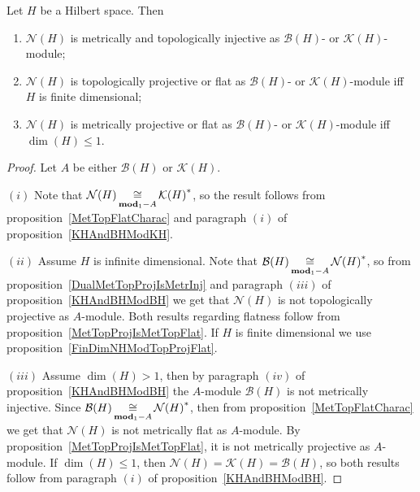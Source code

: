 \begin{proposition}\label{KHAndBHModNH} Let $H$ be a Hilbert space. Then

\begin{enumerate}[label = (\roman*)]
    \item $\mathcal{N}(H)$ is metrically and topologically injective as
    $\mathcal{B}(H)$- or $\mathcal{K}(H)$-module;

    \item $\mathcal{N}(H)$ is topologically projective or flat 
    as $\mathcal{B}(H)$- or $\mathcal{K}(H)$-module 
    iff $H$ is finite dimensional;

    \item $\mathcal{N}(H)$ is metrically projective or flat 
    as $\mathcal{B}(H)$- or $\mathcal{K}(H)$-module iff $\dim(H)\leq 1$.
\end{enumerate}
\end{proposition}
\begin{proof} Let $A$ be either $\mathcal{B}(H)$ or $\mathcal{K}(H)$.

$(i)$ Note that $\mathcal{N}(H)\mathop{\mathbin{\cong}}\limits_{\mathbf{mod}_1-A}{\mathcal{K}(H)}^*$, 
so the result follows from proposition~\ref{MetTopFlatCharac} and 
paragraph $(i)$ of proposition~\ref{KHAndBHModKH}.

$(ii)$ Assume $H$ is infinite dimensional. Note that
$\mathcal{B}(H)\mathop{\mathbin{\cong}}\limits_{\mathbf{mod}_1-A}{\mathcal{N}(H)}^*$, so from
proposition~\ref{DualMetTopProjIsMetrInj} and paragraph $(iii)$ of
proposition~\ref{KHAndBHModBH} we get that $\mathcal{N}(H)$ is not topologically
projective as $A$-module. Both results regarding flatness follow from
proposition~\ref{MetTopProjIsMetTopFlat}. If $H$ is finite dimensional we use
proposition~\ref{FinDimNHModTopProjFlat}.

$(iii)$ Assume $\dim(H)>1$, then by paragraph $(iv)$ of
proposition~\ref{KHAndBHModBH} the $A$-module $\mathcal{B}(H)$ is not metrically
injective. Since $\mathcal{B}(H)\mathop{\mathbin{\cong}}\limits_{\mathbf{mod}_1-A}{\mathcal{N}(H)}^*$, then
from proposition~\ref{MetTopFlatCharac} we get that $\mathcal{N}(H)$ is not
metrically flat as $A$-module. By proposition~\ref{MetTopProjIsMetTopFlat}, it
is not metrically projective as $A$-module. If $\dim(H)\leq 1$, then
$\mathcal{N}(H)=\mathcal{K}(H)=\mathcal{B}(H)$, so both results follow from
paragraph $(i)$ of proposition~\ref{KHAndBHModBH}.
\end{proof}

